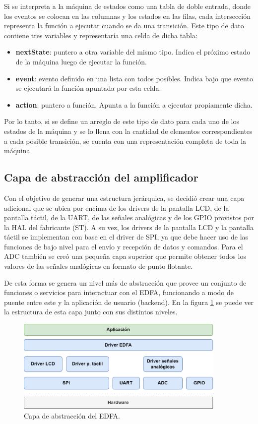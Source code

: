 Si se interpreta a la máquina de estados como una tabla de doble entrada, donde los eventos se colocan en las columnas y los estados en las filas, cada intersección representa la función a ejecutar cuando se da una transición. Este tipo de dato contiene tres variables y representaría una celda de dicha tabla:

\begin{itemize}
\item \textbf{nextState}: puntero a otra variable del mismo tipo. Indica el próximo estado de la máquina luego de ejecutar la función.
\item \textbf{event}: evento definido en una lista con todos posibles. Indica bajo que evento se ejecutará la función apuntada por esta celda.
\item \textbf{action}: puntero a función. Apunta a la función a ejecutar propiamente dicha.
\end{itemize}

Por lo tanto, si se define un arreglo de este tipo de dato para cada uno de los estados de la máquina y se lo llena con la cantidad de elementos correspondientes a cada posible transición, se cuenta con una representación completa de toda la máquina.

\subsection{Capa de abstracción del amplificador}
\label{sec:secHAL}

Con el objetivo de generar una estructura jerárquica, se decidió crear una capa adicional que se ubica por encima de los drivers de la pantalla LCD, de la pantalla táctil, de la UART, de las señales analógicas y de los GPIO provistos por la HAL del fabricante (ST). A su vez, los drivers de la pantalla LCD y la pantalla táctil se implementan con base en el driver de SPI, ya que debe hacer uso de las funciones de bajo nivel para el envío y recepción de datos y comandos. Para el ADC también se creó una pequeña capa superior que permite obtener todos los valores de las señales analógicas en formato de punto flotante.

De esta forma se genera un nivel más de abstracción que provee un conjunto de funciones o servicios para interactuar con el EDFA, funcionando a modo de puente entre este y la aplicación de usuario (backend). En la figura \ref{fig:halAmp} se puede ver la estructura de esta capa junto con sus distintos niveles.

\begin{figure}[H]
\centering
\includegraphics[width=0.9\textwidth]{./Figures/halamp2.png}
\caption{Capa de abstracción del EDFA.}
\label{fig:halAmp}
\end{figure}

